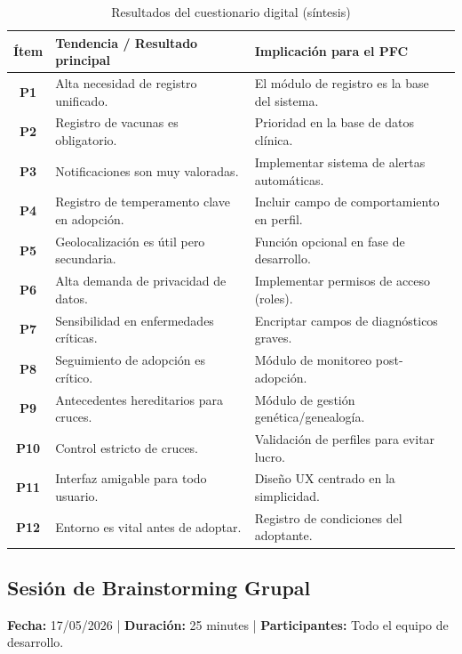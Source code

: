 \documentclass[journal,onecolumn]{IEEEtran}
\begin{document}
\begin{table}[H]
	\caption{Resultados del cuestionario digital (síntesis)}
	\label{tab:cuestionario}
	\begin{tabularx}{\textwidth}{|c|X|l|}
		\hline
		\textbf{Ítem} & \textbf{Tendencia / Resultado principal} & \textbf{Implicación para el PFC} \\
		\hline
		\textbf{P1} & Alta necesidad de registro unificado. & El módulo de registro es la base del sistema. \\
		\hline
		\textbf{P2} & Registro de vacunas es obligatorio. & Prioridad en la base de datos clínica. \\
		\hline
		\textbf{P3} & Notificaciones son muy valoradas. & Implementar sistema de alertas automáticas. \\
		\hline
		\textbf{P4} & Registro de temperamento clave en adopción. & Incluir campo de comportamiento en perfil. \\
		\hline
		\textbf{P5} & Geolocalización es útil pero secundaria. & Función opcional en fase de desarrollo. \\
		\hline
		\textbf{P6} & Alta demanda de privacidad de datos. & Implementar permisos de acceso (roles). \\
		\hline
		\textbf{P7} & Sensibilidad en enfermedades críticas. & Encriptar campos de diagnósticos graves. \\
		\hline
		\textbf{P8} & Seguimiento de adopción es crítico. & Módulo de monitoreo post-adopción. \\
		\hline
		\textbf{P9} & Antecedentes hereditarios para cruces. & Módulo de gestión genética/genealogía. \\
		\hline
		\textbf{P10} & Control estricto de cruces. & Validación de perfiles para evitar lucro. \\
		\hline
		\textbf{P11} & Interfaz amigable para todo usuario. & Diseño UX centrado en la simplicidad. \\
		\hline
		\textbf{P12} & Entorno es vital antes de adoptar. & Registro de condiciones del adoptante. \\
		\hline
	\end{tabularx}
\end{table}

\subsection{Sesión de Brainstorming Grupal}

\textbf{Fecha:} 17/05/2026 | \textbf{Duración:} 25 minutes | \textbf{Participantes:} Todo el equipo de desarrollo.
\end{document}

